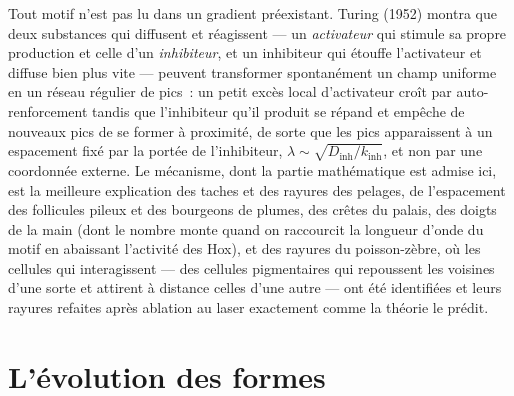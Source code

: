 \begin{proposition}\label{prop:b3:developmental-genetics:turing}
Tout motif n'est pas lu dans un gradient préexistant. Turing (1952)
montra que deux substances qui diffusent et réagissent --- un
\emph{activateur} qui stimule sa propre production et celle d'un
\emph{inhibiteur}, et un inhibiteur qui étouffe l'activateur et diffuse
bien plus vite --- peuvent transformer spontanément un champ uniforme en
un réseau régulier de pics~: un petit excès local d'activateur croît par
auto-renforcement tandis que l'inhibiteur qu'il produit se répand et
empêche de nouveaux pics de se former à proximité, de sorte que les pics
apparaissent à un espacement fixé par la portée de l'inhibiteur,
$\lambda \sim \sqrt{D_{\text{inh}}/k_{\text{inh}}}$, et non par une
coordonnée externe. Le mécanisme, dont la partie mathématique est admise
ici, est la meilleure explication des taches et des rayures des pelages,
de l'espacement des follicules pileux et des bourgeons de plumes, des
crêtes du palais, des doigts de la main (dont le nombre monte quand on
raccourcit la longueur d'onde du motif en abaissant l'activité des Hox),
et des rayures du poisson-zèbre, où les cellules qui interagissent ---
des cellules pigmentaires qui repoussent les voisines d'une sorte et
attirent à distance celles d'une autre --- ont été identifiées et leurs
rayures refaites après ablation au laser exactement comme la théorie le
prédit.
\end{proposition}
\admitted

\section{L'évolution des formes}

